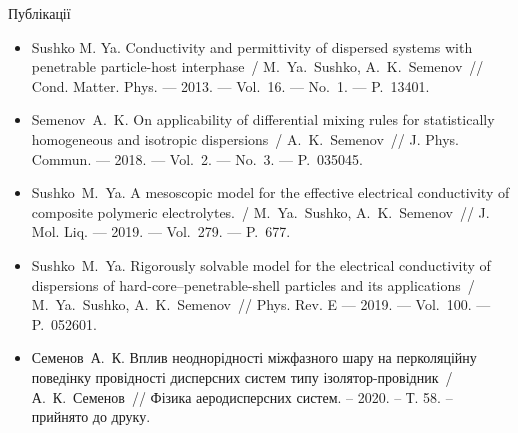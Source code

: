 \documentclass[10pt]{beamer}
\begin{document}
\begin{frame}{Публікації}
\footnotesize
  \begin{itemize}
    \item
    Sushko M. Ya. Conductivity and permittivity of dispersed systems 
    with penetrable particle-host interphase~/ M.~Ya.~Sushko, 
    A.~K.~Semenov~// Cond. Matter. Phys. --- 2013. --- Vol.~16. --- No.~1. 
    --- P.~13401.
    
    \item
    Semenov~A.~K. On applicability of differential mixing rules for
      statistically homogeneous and isotropic dispersions~/ A.~K.~Semenov~//
      J. Phys. Commun. --- 2018. --- Vol.~2. --- No.~3. --- P.~035045.
    
    \item
    Sushko~M.~Ya. A mesoscopic model for the effective electrical 
    conductivity of composite polymeric electrolytes.~/ M.~Ya.~Sushko,
    A.~K.~Semenov~// J. Mol. Liq. --- 2019. --- Vol.~279. --- P.~677. 
    
    \item
    Sushko~M.~Ya. Rigorously solvable model for the electrical conductivity of dispersions of hard-core--penetrable-shell particles and its applications~/
    M.~Ya.~Su\-shko, A.~K.~Semenov~//
    Phys. Rev. E --- 2019. --- Vol.~100. --- P.~052601.
    
    \item
    Семенов~А.~К. Вплив неоднорідності міжфазного шару на перколяційну поведінку провідності дисперсних систем типу ізолятор-провідник~/ А.~К.~Семенов~// Фізика аеродисперсних систем. -- 2020. -- Т. 58. -- прийнято до друку.
  \end{itemize}

\end{frame}
\end{document}
